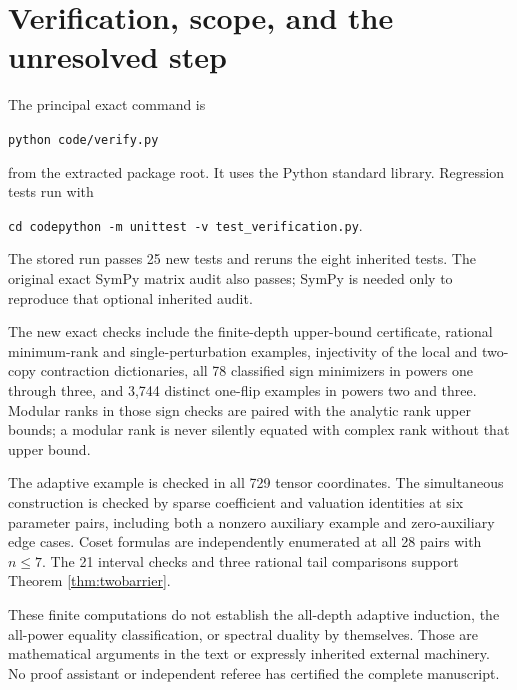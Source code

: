 \documentclass[11pt,letterpaper]{article}
\theoremstyle{definition}\newtheorem{definition}[theorem]{Definition}
\theoremstyle{remark}\newtheorem{remark}[theorem]{Remark}
\begin{document}
\section{Verification, scope, and the unresolved step}
The principal exact command is
\begin{center}\texttt{python code/verify.py}\end{center}
from the extracted package root. It uses the Python standard library. Regression tests run with
\begin{center}\texttt{cd code}\qquad\texttt{python -m unittest -v test\_verification.py}.\end{center}
The stored run passes 25 new tests and reruns the eight inherited tests. The original exact SymPy matrix audit also passes; SymPy is needed only to reproduce that optional inherited audit.

The new exact checks include the finite-depth upper-bound certificate, rational minimum-rank and single-perturbation examples, injectivity of the local and two-copy contraction dictionaries, all 78 classified sign minimizers in powers one through three, and 3,744 distinct one-flip examples in powers two and three. Modular ranks in those sign checks are paired with the analytic rank upper bounds; a modular rank is never silently equated with complex rank without that upper bound.

The adaptive example is checked in all 729 tensor coordinates. The simultaneous construction is checked by sparse coefficient and valuation identities at six parameter pairs, including both a nonzero auxiliary example and zero-auxiliary edge cases. Coset formulas are independently enumerated at all 28 pairs with $n\leq7$. The 21 interval checks and three rational tail comparisons support Theorem \ref{thm:twobarrier}.

These finite computations do not establish the all-depth adaptive induction, the all-power equality classification, or spectral duality by themselves. Those are mathematical arguments in the text or expressly inherited external machinery. No proof assistant or independent referee has certified the complete manuscript.
\end{document}
